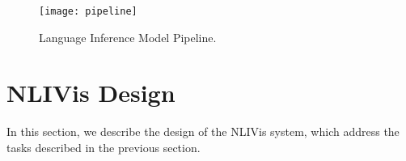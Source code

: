 \begin{figure}[htbp]
\centering
\vspace{-2mm}
 \texttt{[image: pipeline]}
 \caption{Language Inference Model Pipeline.}
\label{fig:modelPipeline}
\end{figure}

\section{NLIVis Design}
In this section, we describe the design of the NLIVis system, which address the tasks described in the previous section.


%
